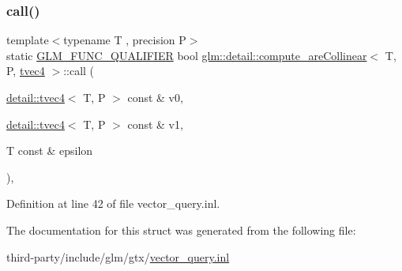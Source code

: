 \subsubsection{\texorpdfstring{call()}{call()}}
{\footnotesize\ttfamily template$<$typename T , precision P$>$ \\
static \hyperlink{setup_8hpp_a33fdea6f91c5f834105f7415e2a64407}{G\+L\+M\+\_\+\+F\+U\+N\+C\+\_\+\+Q\+U\+A\+L\+I\+F\+I\+ER} bool \hyperlink{structglm_1_1detail_1_1compute__are_collinear}{glm\+::detail\+::compute\+\_\+are\+Collinear}$<$ T, P, \hyperlink{structglm_1_1detail_1_1tvec4}{tvec4} $>$\+::call (\begin{DoxyParamCaption}\item[{\hyperlink{structglm_1_1detail_1_1tvec4}{detail\+::tvec4}$<$ T, P $>$ const \&}]{v0,  }\item[{\hyperlink{structglm_1_1detail_1_1tvec4}{detail\+::tvec4}$<$ T, P $>$ const \&}]{v1,  }\item[{T const \&}]{epsilon }\end{DoxyParamCaption})\hspace{0.3cm}{\ttfamily [inline]}, {\ttfamily [static]}}



Definition at line 42 of file vector\+\_\+query.\+inl.



The documentation for this struct was generated from the following file\+:\begin{DoxyCompactItemize}
\item 
third-\/party/include/glm/gtx/\hyperlink{vector__query_8inl}{vector\+\_\+query.\+inl}\end{DoxyCompactItemize}
